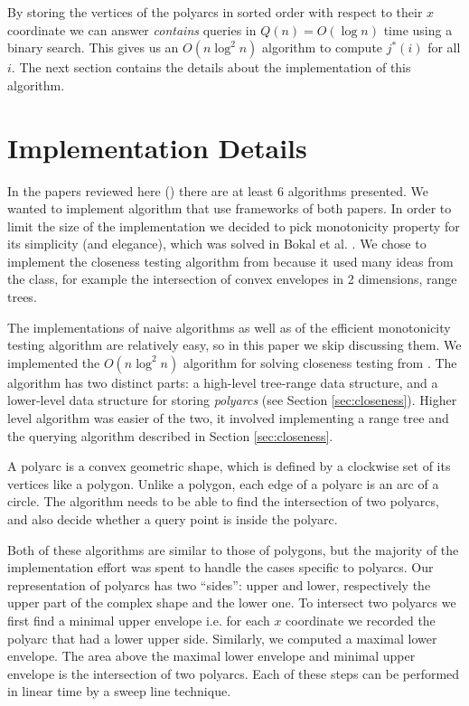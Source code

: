 \documentclass{article}
\begin{document}
By storing the vertices of the polyarcs in sorted order with respect to their $x$ coordinate we can answer \textit{contains} queries in $Q(n) = O(\log n)$ time using a binary search. This gives us an $O(n\log^2 n)$ algorithm to compute $j^*(i)$ for all $i$. The next section contains the details about the implementation of this algorithm.

\section{Implementation Details}
\label{sec:implementation}
In the papers reviewed here (\cite{bokal2015,chan2016}) there are at least 6 algorithms presented. We wanted to implement algorithm that use frameworks of both papers. In order to limit the size of the implementation we decided to pick monotonicity property for its simplicity (and elegance), which was solved in Bokal et al. \cite{bokal2015}. We chose to implement the closeness testing algorithm from \cite{chan2016} because it used many ideas from the class, for example the intersection of convex envelopes in 2 dimensions, range trees.

The implementations of naive algorithms as well as of the efficient monotonicity testing algorithm are relatively easy, so in this paper we skip discussing them. We implemented the $O(n \log ^2 n)$ algorithm for solving closeness testing from \cite{chan2016}.  The algorithm has two distinct parts: a high-level tree-range data structure, and a lower-level data structure for storing \textit{polyarcs} (see Section \ref{sec:closeness}).
Higher level algorithm was easier of the two, it involved implementing a range tree and the querying algorithm described in Section \ref{sec:closeness}.

A polyarc is a convex geometric shape, which is defined by a clockwise set of its vertices like a polygon. Unlike a polygon, each edge of a polyarc is an arc of a circle. The algorithm needs to be able to find the intersection of two polyarcs, and also decide whether a query point is inside the polyarc.

Both of these algorithms are similar to those of polygons, but the majority of the implementation effort was spent to handle the cases specific to polyarcs. Our representation of polyarcs has two ``sides'': upper and lower, respectively the upper part of the complex shape and the lower one. To intersect two polyarcs we first find a minimal upper envelope i.e. for each $x$ coordinate we recorded the polyarc that had a lower upper side. Similarly, we computed a maximal lower envelope. The area above the maximal lower envelope and minimal upper envelope is the intersection of two polyarcs. Each of these steps can be performed in linear time by a sweep line technique.
\end{document}
